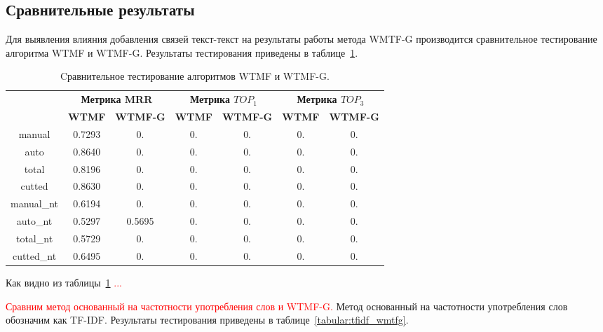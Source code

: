 \subsection{Сравнительные результаты}
    Для выявления влияния добавления связей текст-текст на результаты работы метода WMTF-G производится сравнительное тестирование алгоритма WTMF и WTMF-G.
    Результаты тестирования приведены в таблице~\ref{tabular:wtmf_wmtfg}.

    \begin{table}[h!]
    \caption{Cравнительное тестирование алгоритмов WTMF и WTMF-G. \bigskip}
    \centering

    \label{tabular:wtmf_wmtfg}
        \begin{tabular}{|c|c|c|c|c|c|c|}
            \hline
            \bf{\multirow{2}{*}{\specialcell{Набор данных}}} &
            \multicolumn{2}{|c|}{\bf{Метрика MRR}} &
            \multicolumn{2}{|c|}{\bf{Метрика $TOP_1$}} &
            \multicolumn{2}{|c|}{\bf{Метрика $TOP_3$}} \\ \cline{2-7}
            & \bf{WTMF} & \bf{WTMF-G} & \bf{WTMF} & \bf{WTMF-G} & \bf{WTMF} & \bf{WTMF-G} \\ \hline
            manual & 0.7293 & 0. & 0. & 0. & 0. & 0. \\ \hline
            auto & 0.8640 & 0. & 0. & 0. & 0. & 0. \\ \hline
            total & 0.8196 & 0. & 0. & 0. & 0. & 0. \\ \hline
            cutted & 0.8630 & 0. & 0. & 0. & 0. & 0. \\ \hline
            manual\_nt & 0.6194 & 0. & 0. & 0. & 0. & 0. \\ \hline
            auto\_nt & 0.5297 & 0.5695 & 0. & 0. & 0. & 0. \\ \hline
            total\_nt & 0.5729 & 0. & 0. & 0. & 0. & 0. \\ \hline
            cutted\_nt & 0.6495 & 0. & 0. & 0. & 0. & 0. \\ \hline
        \end{tabular}
    \end{table}
    Как видно из таблицы~\ref{tabular:wtmf_wmtfg} \textcolor{red}{...}

    \textcolor{red}{Сравним метод основанный на частотности употребления слов и WTMF-G.}
    Метод основанный на частотности употребления слов обозначим как TF-IDF.
    Результаты тестирования приведены в таблице~\ref{tabular:tfidf_wmtfg}.

